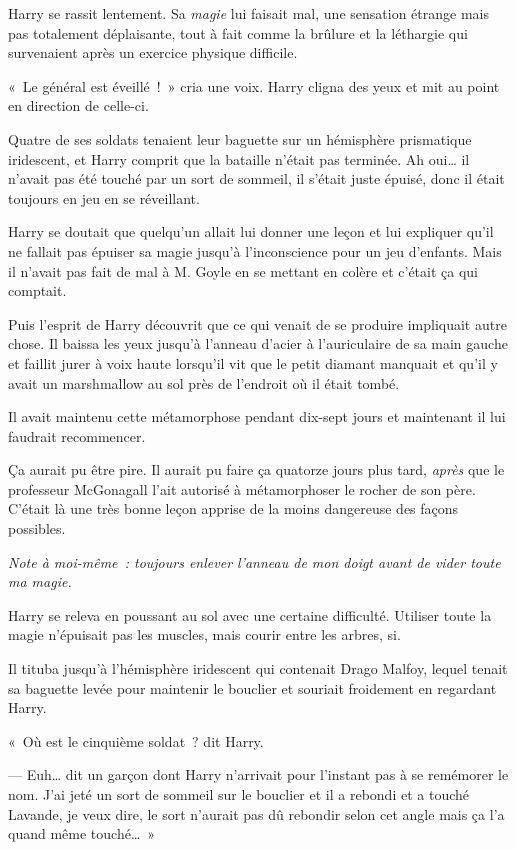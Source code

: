 Harry se rassit lentement. Sa \emph{magie} lui faisait mal, une sensation étrange mais pas totalement déplaisante, tout à fait comme la brûlure et la léthargie qui survenaient après un exercice physique difficile.

«~Le général est éveillé~!~» cria une voix. Harry cligna des yeux et mit au point en direction de celle-ci.

Quatre de ses soldats tenaient leur baguette sur un hémisphère prismatique iridescent, et Harry comprit que la bataille n'était pas terminée. Ah oui… il n'avait pas été touché par un sort de sommeil, il s'était juste épuisé, donc il était toujours en jeu en se réveillant.

Harry se doutait que quelqu'un allait lui donner une leçon et lui expliquer qu'il ne fallait pas épuiser sa magie jusqu'à l'inconscience pour un jeu d'enfants. Mais il n'avait pas fait de mal à M. Goyle en se mettant en colère et c'était ça qui comptait.

Puis l'esprit de Harry découvrit que ce qui venait de se produire impliquait autre chose. Il baissa les yeux jusqu'à l'anneau d'acier à l'auriculaire de sa main gauche et faillit jurer à voix haute lorsqu'il vit que le petit diamant manquait et qu'il y avait un marshmallow au sol près de l'endroit où il était tombé.

Il avait maintenu cette métamorphose pendant dix-sept jours et maintenant il lui faudrait recommencer.

Ça aurait pu être pire. Il aurait pu faire ça quatorze jours plus tard, \emph{après} que le professeur McGonagall l'ait autorisé à métamorphoser le rocher de son père. C'était là une très bonne leçon apprise de la moins dangereuse des façons possibles.

\emph{Note à moi-même~: toujours enlever l'anneau de mon doigt avant de vider toute ma magie.}

Harry se releva en poussant au sol avec une certaine difficulté. Utiliser toute la magie n'épuisait pas les muscles, mais courir entre les arbres, si.

Il tituba jusqu'à l'hémisphère iridescent qui contenait Drago Malfoy, lequel tenait sa baguette levée pour maintenir le bouclier et souriait froidement en regardant Harry.

«~Où est le cinquième soldat~? dit Harry.

--- Euh… dit un garçon dont Harry n'arrivait pour l'instant pas à se remémorer le nom. J'ai jeté un sort de sommeil sur le bouclier et il a rebondi et a touché Lavande, je veux dire, le sort n'aurait pas dû rebondir selon cet angle mais ça l'a quand même touché…~»

